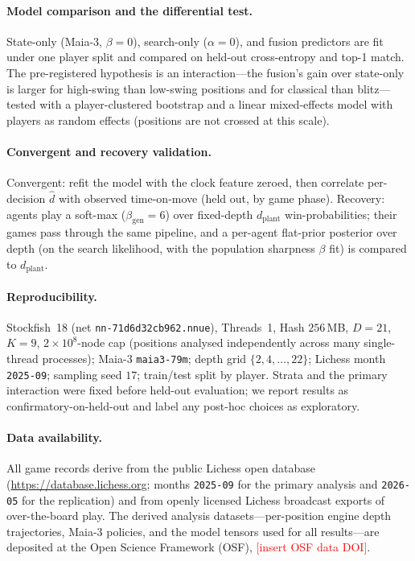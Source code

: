 \documentclass[11pt]{article}
\newcommand{\todo}[1]{\textcolor{red}{[#1]}}
\begin{document}
\paragraph{Model comparison and the differential test.} State-only (Maia-3, $\beta{=}0$),
search-only ($\alpha{=}0$), and fusion predictors are fit under one player split and compared
on held-out cross-entropy and top-1 match. The pre-registered hypothesis is an interaction---the
fusion's gain over state-only is larger for high-swing than low-swing positions and for
classical than blitz---tested with a player-clustered bootstrap and a linear mixed-effects
model with players as random effects (positions are not crossed at this scale).

\paragraph{Convergent and recovery validation.} Convergent: refit the model with the clock
feature zeroed, then correlate per-decision $\hat d$ with observed time-on-move (held out, by
game phase). Recovery: agents play a soft-max ($\beta_{\text{gen}}{=}6$) over fixed-depth
$d_{\text{plant}}$ win-probabilities; their games pass through the same pipeline, and a
per-agent flat-prior posterior over depth (on the search likelihood, with the population
sharpness $\beta$ fit) is compared to $d_{\text{plant}}$.

\paragraph{Reproducibility.} Stockfish~18 (net \texttt{nn-71d6d32cb962.nnue}), Threads~1,
Hash $256$\,MB, $D{=}21$, $K{=}9$, $2\!\times\!10^{8}$-node cap (positions analysed
independently across many single-thread processes); Maia-3 \texttt{maia3-79m}; depth grid
$\{2,4,\dots,22\}$; Lichess month \texttt{2025-09}; sampling seed $17$; train/test split by
player. Strata and the primary interaction were fixed before held-out evaluation; we report
results as confirmatory-on-held-out and label any post-hoc choices as exploratory.

\paragraph{Data availability.} All game records derive from the public Lichess open database
(\url{https://database.lichess.org}; months \texttt{2025-09} for the primary analysis and
\texttt{2026-05} for the replication) and from openly licensed Lichess broadcast exports of
over-the-board play. The derived analysis datasets---per-position engine depth trajectories,
Maia-3 policies, and the model tensors used for all results---are deposited at the Open Science
Framework (OSF), \todo{insert OSF data DOI}.
\end{document}
